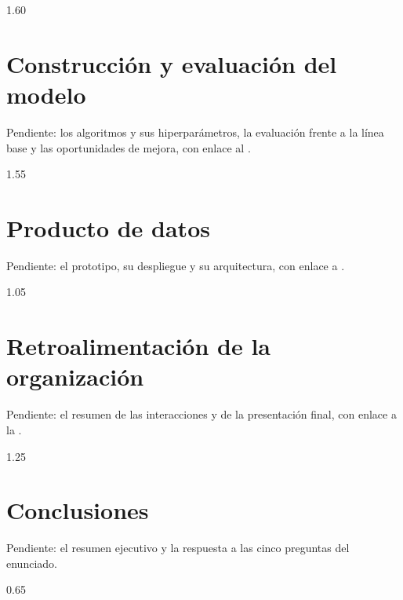 \documentclass[12pt,letterpaper]{article}
\begin{document}
\begin{espacio}{1.60}
\section{Construcción y evaluación del modelo} %
Pendiente: los algoritmos y sus hiperparámetros, la evaluación frente a la línea base y
las oportunidades de mejora, con enlace al
.

\end{espacio}

\begin{espacio}{1.55}
\section{Producto de datos} %
Pendiente: el prototipo, su despliegue y su arquitectura, con enlace a
.

\end{espacio}

\begin{espacio}{1.05}
\section{Retroalimentación de la organización} %
Pendiente: el resumen de las interacciones y de la presentación final, con enlace a la
.

\end{espacio}

\begin{espacio}{1.25}
\section{Conclusiones} %
Pendiente: el resumen ejecutivo y la respuesta a las cinco preguntas del enunciado.

\end{espacio}

\begin{espacio}[referencias]{0.65}
\printbibliography
\end{espacio}
\end{document}
